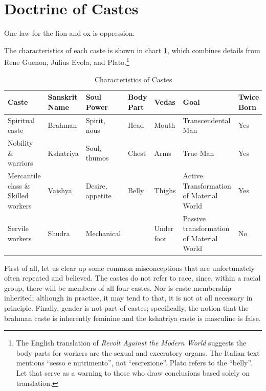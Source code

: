 \section{Doctrine of Castes}

\label{sec:DoctrineCastes}

\begin{quotex}
One law for the lion and ox is oppression.
\end{quotex}


The characteristics of each caste is shown in chart \ref{tab:CharacteristicsCaste}, which combines details from Rene Guenon, Julius Evola, and Plato.\footnote{The English translation of \textit{Revolt Against the Modern World} suggests the body parts for workers are the sexual and execratory organs. The Italian text mentions ``sesso e nutrimento'', not ``escrezione''. Plato refers to the ``belly''. Let that serve as a warning to those who draw conclusions based solely on translation.}

\begin{table}[h]\footnotesize\centering
\begin{tabular}{*{7}{p{}}}\toprule
Caste & Sanskrit Name & Soul Power & Body Part & Vedas & Goal & Twice Born \\\midrule

Spiritual caste & Brahman & Spirit, nous & Head & Mouth & Transcendental Man & Yes \\

Nobility \& warriors & Kshatriya & Soul, thumos & Chest & Arms & True Man & Yes \\

Mercantile class \& Skilled workers & Vaishya & Desire, appetite & Belly & Thighs & Active Transformation of Material World & Yes \\

Servile workers & Shudra & Mechanical & ~ & Under foot & Passive transformation of Material World & No \\\bottomrule
\end{tabular}
\label{tab:CharacteristicsCaste}
\caption{Characteristics of Castes}
\end{table}

First of all, let us clear up some common misconceptions that are unfortunately often repeated and believed. The castes do not refer to race, since, within a racial group, there will be members of all four castes. Nor is caste membership inherited; although in practice, it may tend to that, it is not at all necessary in principle. Finally, gender is not part of castes; specifically, the notion that the brahman caste is inherently feminine and the kshatriya caste is masculine is false.

